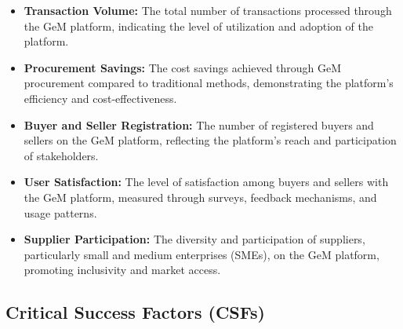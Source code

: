 \begin{itemize}
    \item \textbf{Transaction Volume:} The total number of transactions processed through the GeM platform, indicating the level of utilization and adoption of the platform.
    
    \item \textbf{Procurement Savings:} The cost savings achieved through GeM procurement compared to traditional methods, demonstrating the platform's efficiency and cost-effectiveness.
    
    \item \textbf{Buyer and Seller Registration:} The number of registered buyers and sellers on the GeM platform, reflecting the platform's reach and participation of stakeholders.
    
    \item \textbf{User Satisfaction:} The level of satisfaction among buyers and sellers with the GeM platform, measured through surveys, feedback mechanisms, and usage patterns.
    
    \item \textbf{Supplier Participation:} The diversity and participation of suppliers, particularly small and medium enterprises (SMEs), on the GeM platform, promoting inclusivity and market access.
\end{itemize}

\subsection{Critical Success Factors (CSFs)}


